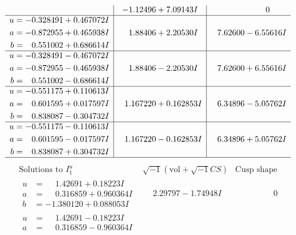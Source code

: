 \documentclass[1p]{elsarticle_modified}
\theoremstyle{definition}
\newcommand{\I}{\sqrt{-1}}
\begin{document}
$$\begin{array}{c|c|c}
 & -1.12496 + 7.09143 I & \phantom{-0.000000 } 0 \\ \hline\begin{aligned}
u &= -0.328491 + 0.467072 I \\
a &= -0.872955 + 0.465938 I \\
b &= \phantom{-}0.551002 + 0.686614 I\end{aligned}
 & \phantom{-}1.88406 + 2.20530 I & \phantom{-}7.62600 - 6.55616 I \\ \hline\begin{aligned}
u &= -0.328491 - 0.467072 I \\
a &= -0.872955 - 0.465938 I \\
b &= \phantom{-}0.551002 - 0.686614 I\end{aligned}
 & \phantom{-}1.88406 - 2.20530 I & \phantom{-}7.62600 + 6.55616 I \\ \hline\begin{aligned}
u &= -0.551175 + 0.110613 I \\
a &= \phantom{-}0.601595 + 0.017597 I \\
b &= \phantom{-}0.838087 - 0.304732 I\end{aligned}
 & \phantom{-}1.167220 + 0.162853 I & \phantom{-}6.34896 - 5.05762 I \\ \hline\begin{aligned}
u &= -0.551175 - 0.110613 I \\
a &= \phantom{-}0.601595 - 0.017597 I \\
b &= \phantom{-}0.838087 + 0.304732 I\end{aligned}
 & \phantom{-}1.167220 - 0.162853 I & \phantom{-}6.34896 + 5.05762 I\\
 \hline 
 \end{array}$$\newpage$$\begin{array}{c|c|c}  
\text{Solutions to }I^u_{1}& \I (\text{vol} + \sqrt{-1}CS) & \text{Cusp shape}\\
 \hline 
\begin{aligned}
u &= \phantom{-}1.42691 + 0.18223 I \\
a &= \phantom{-}0.316859 + 0.960364 I \\
b &= -1.380120 + 0.088053 I\end{aligned}
 & \phantom{-}2.29797 - 1.74948 I & \phantom{-0.000000 } 0 \\ \hline\begin{aligned}
u &= \phantom{-}1.42691 - 0.18223 I \\
a &= \phantom{-}0.316859 - 0.960364 I \\

\end{aligned}
\end{array}$$
\end{document}
